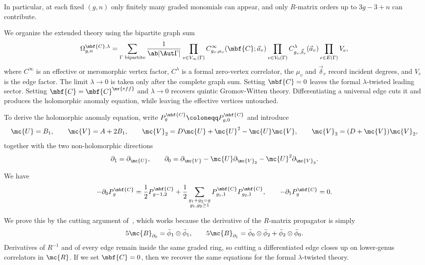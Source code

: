 In particular, at each fixed \((g,n)\) only finitely many graded monomials can appear, and only \(R\)-matrix orders up to \(3g-3+n\) can contribute.

We organize the extended theory using the bipartite graph sum
\[ \Omega^{\mbf{C},\lambda}_{g,n} = \sum_{\Gamma \text{ bipartite}} \frac{1}{\ab|\Aut\Gamma|}\prod_{v\in V_{\infty}(\Gamma)} C^{\infty}_{g_v,\mu_v}(\mbf{C};\vec{a}_v) \prod_{v \in V_0(\Gamma)}C^{\lambda}_{g_v,\vec{\delta}_v}(\vec{a}_v)\prod_{e \in E(\Gamma)}V_e, \]
where \(C^{\infty}\) is an effective or meromorphic vertex factor, \(C^{\lambda}\) is a formal zero-vertex correlator, the \(\mu_v\) and \(\vec{\delta}_v\) record incident degrees, and \(V_e\) is the edge factor. The limit \(\lambda \to 0\) is taken only after the complete graph sum. Setting \(\mbf{C}=0\) leaves the formal \(\lambda\)-twisted leading sector. Setting \(\mbf{C}=\mbf{C}^{\mr{eff}}\) and \(\lambda\to0\) recovers quintic Gromov-Witten theory. Differentiating a universal edge cuts it and produces the holomorphic anomaly equation, while leaving the effective vertices untouched.

To derive the holomorphic anomaly equation, write \(P^{\mbf{C}}_g \coloneqq P^{\mbf{C}}_{g,0}\) and introduce
\[ \mc{U} = B_1, \qquad \mc{V} = A + 2B_1, \qquad \mc{V}_2 = D\mc{U} + \mc{U}^2 - \mc{U}\mc{V}, \qquad \mc{V}_3 = (D+\mc{V})\mc{V}_2, \]
together with the two non-holomorphic directions
\[ \partial_1 = \partial_{\mc{U}}, \qquad \partial_0 = \partial_{\mc{V}} - \mc{U}\partial_{\mc{V}_2} - \mc{U}^2\partial_{\mc{V}_3}. \]

\begin{thm}
    We have
    \[ -\partial_0 P^{\mbf{C}}_g = \frac{1}{2}P^{\mbf{C}}_{g-1,2} + \frac{1}{2}\sum_{\substack{g_1+g_2=g\\g_1,g_2\geq1}}P^{\mbf{C}}_{g_1,1}P^{\mbf{C}}_{g_2,1}, \qquad -\partial_1 P^{\mbf{C}}_g = 0. \]
\end{thm}

We prove this by the cutting argument of~, which works because the derivative of the \(R\)-matrix propagator is simply
\[ 5\mc{B}_{\partial_0} = \bar{\phi}_1 \otimes \bar{\phi}_1, \qquad 5\mc{B}_{\partial_1} = \bar{\phi}_0\otimes\bar{\phi}_2 + \bar{\phi}_2\otimes\bar{\phi}_0. \]
Derivatives of \(R^{-1}\) and of every edge remain inside the same graded ring, so cutting a differentiated edge closes up on lower-genus correlators in \(\mc{R}\). If we set \(\mbf{C}=0\), then we recover the same equations for the formal \(\lambda\)-twisted theory.

